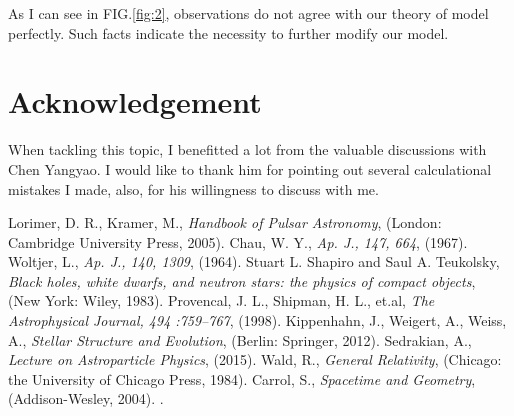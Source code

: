 \documentclass[reprint]{revtex4-1}
\begin{document}
  \begin{table}[!htp]
  	\centering
  	    \caption{Typical White Dwarfs' Mass and Radius}
  \end{table}
  As I can see in FIG.\ref{fig:2}, observations do not agree with our theory of model perfectly. Such facts indicate the necessity to further modify our model.
   
  
  \section*{Acknowledgement}
  When tackling this topic, I benefitted a lot from the valuable discussions with Chen Yangyao. I would like to thank him for pointing out several calculational mistakes I made, also, for his willingness to discuss with me.
  	
\begin{thebibliography}{99}	
 Lorimer, D. R., Kramer, M., \textit{Handbook of Pulsar Astronomy}, (London: Cambridge University Press, 2005).
 Chau, W. Y.,  \textit{Ap. J., 147, 664}, (1967).
 Woltjer, L.,  \textit{Ap. J., 140, 1309}, (1964).
 Stuart L. Shapiro and Saul A. Teukolsky, \textit{Black holes, white dwarfs, and neutron stars: the physics of compact objects}, (New York: Wiley, 1983).
 Provencal, J. L.,  Shipman, H. L., et.al, \textit{The Astrophysical Journal, 494 :759--767}, (1998).
 Kippenhahn, J.,  Weigert, A., Weiss, A., \textit{Stellar Structure and Evolution}, (Berlin: Springer, 2012).
 Sedrakian, A.,  \textit{Lecture on Astroparticle Physics}, (2015).
 Wald, R.,  \textit{General Relativity}, (Chicago: the University of Chicago Press, 1984).
 Carrol, S.,  \textit{Spacetime and Geometry}, (Addison-Wesley, 2004).
.
 \end{thebibliography}
\end{document}
